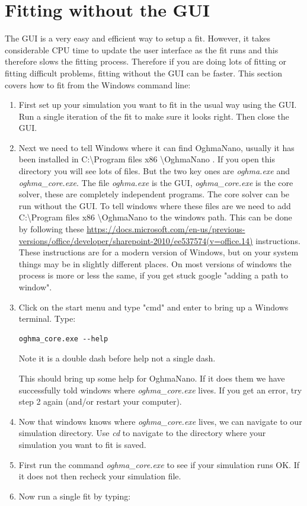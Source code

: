 \section{Fitting without the GUI}
The GUI is a very easy and efficient way to setup a fit. However, it takes considerable CPU time to update the user interface as the fit runs and this therefore slows the fitting process. Therefore if you are doing lots of fitting or fitting difficult problems, fitting without the GUI can be faster.  This section covers how to fit from the Windows command line:

\begin{enumerate}
  \item First set up your simulation you want to fit in the usual way using the GUI. Run a single iteration of the fit to make sure it looks right.  Then close the GUI.
  \item Next we need to tell Windows where it can find OghmaNano, usually it has been installed in C:\textbackslash Program files x86 \textbackslash OghmaNano . If you open this directory you will see lots of files.  But the two key ones are \emph{oghma.exe} and \emph{oghma\_core.exe}. The file \emph{oghma.exe} is the GUI, \emph{oghma\_core.exe} is the core solver, these are completely independent programs.  The core solver can be run without the GUI.  To tell windows where these files are we need to add C:\textbackslash Program files x86 \textbackslash OghmaNano to the windows path. This can be done by following these \url{https://docs.microsoft.com/en-us/previous-versions/office/developer/sharepoint-2010/ee537574(v=office.14)} instructions.  These instructions are for a modern version of Windows, but on your system things may be in slightly different places. On most versions of windows the process is more or less the same, if you get stuck google "adding a path to window".

  \item Click on the start menu and type "cmd" and enter to bring up a Windows terminal.  Type:
\begin{listing}[H]
\begin{verbatim}
oghma_core.exe --help
\end{verbatim}
\end{listing}
Note it is a double dash before help not a single dash.

This should bring up some help for OghmaNano.  If it does them we have successfully told windows where \emph{oghma\_core.exe} lives. If you get an error, try step 2 again (and/or restart your computer).
  \item Now that windows knows where \emph{oghma\_core.exe} lives, we can navigate to our simulation directory.  Use \emph{cd} to navigate to the directory where your simulation you want to fit is saved.
  \item First run the command \emph{oghma\_core.exe} to see if your simulation runs OK. If it does not then recheck your simulation file.
  \item Now run a single fit by typing:


\end{enumerate}
